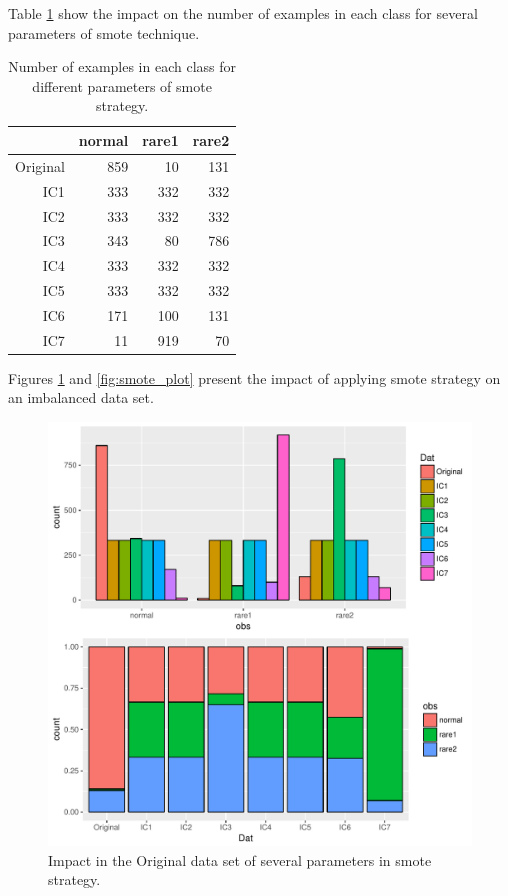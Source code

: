 \documentclass[10pt,a4paper]{article}\usepackage[]{graphicx}\usepackage[]{color}
\makeatletter
\def\maxwidth{ %
  \ifdim\Gin@nat@width>\linewidth
    \linewidth
  \else
    \Gin@nat@width
  \fi
}
\newenvironment{knitrout}{}{} %
\makeatother
\begin{document}
Table \ref{tab:iris_smote_table} show the impact on the number of examples in each class for several parameters of smote technique.

\begin{table}[ht]
\centering
\begin{tabular}{rrrr}
  \hline
 & normal & rare1 & rare2 \\ 
  \hline
Original & 859 &  10 & 131 \\ 
  IC1 & 333 & 332 & 332 \\ 
  IC2 & 333 & 332 & 332 \\ 
  IC3 & 343 &  80 & 786 \\ 
  IC4 & 333 & 332 & 332 \\ 
  IC5 & 333 & 332 & 332 \\ 
  IC6 & 171 & 100 & 131 \\ 
  IC7 &  11 & 919 &  70 \\ 
   \hline
\end{tabular}
\caption{Number of examples in each class for different parameters of smote strategy.} 
\label{tab:iris_smote_table}
\end{table}


Figures \ref{fig:smote_plot_hist} and \ref{fig:smote_plot} present the impact of applying smote strategy on an imbalanced data set.

\begin{knitrout}\footnotesize
{}\color{fgcolor}\begin{figure}

{\centering \includegraphics[width=\maxwidth,height=0.5\textheight]{figures/UBL-smote_plot_hist-1} 

}

\caption[Impact in the Original data set of several parameters in smote strategy]{Impact in the Original data set of several parameters in smote strategy. }\label{fig:smote_plot_hist}
\end{figure}


\end{knitrout}
\end{document}
